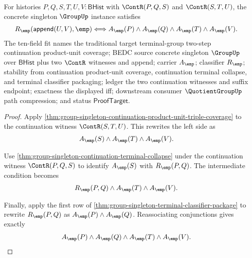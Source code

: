 \begin{theorem}
\label{thm:group-singleton-double-continuation-product-unit-chain-coverage}
For histories $P,Q,S,T,U,V:\mathsf{BHist}$ with $\ContR(P,Q,S)$ and
$\ContR(S,T,U)$, the concrete singleton $\GroupUp$ instance satisfies
$$
R_{\emp}(\mathsf{append}(U,V),\emp)\Longleftrightarrow
A_{\emp}(P)\land A_{\emp}(Q)\land A_{\emp}(T)\land A_{\emp}(V).
$$
The ten-field fit names the traditional target terminal-group two-step
continuation product-unit coverage; BEDC source concrete singleton $\GroupUp$
over $\mathsf{BHist}$ plus two $\ContR$ witnesses and append; carrier
$A_{\emp}$; classifier $R_{\emp}$; stability from continuation product-unit
coverage, continuation terminal collapse, and terminal classifier packaging;
ledger the two continuation witnesses and suffix endpoint; exactness the
displayed iff; downstream consumer $\QuotientGroupUp$ path compression; and
status $\mathsf{ProofTarget}$.
\end{theorem}
\begin{proof}
Apply \autoref{thm:group-singleton-continuation-product-unit-triple-coverage}
to the continuation witness $\ContR(S,T,U)$. This rewrites the left side as
$$
A_{\emp}(S)\land A_{\emp}(T)\land A_{\emp}(V).
$$

Use \autoref{thm:group-singleton-continuation-terminal-collapse} under the
continuation witness $\ContR(P,Q,S)$ to identify $A_{\emp}(S)$ with
$R_{\emp}(P,Q)$. The intermediate condition becomes
$$
R_{\emp}(P,Q)\land A_{\emp}(T)\land A_{\emp}(V).
$$

Finally, apply the first row of
\autoref{thm:group-singleton-terminal-classifier-package} to rewrite
$R_{\emp}(P,Q)$ as $A_{\emp}(P)\land A_{\emp}(Q)$. Reassociating conjunctions
gives exactly
$$
A_{\emp}(P)\land A_{\emp}(Q)\land A_{\emp}(T)\land A_{\emp}(V).
$$
\end{proof}

